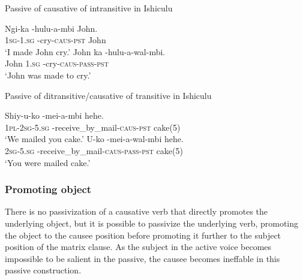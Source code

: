 \begin{exe}
\ex Passive of causative of intransitive in Ishiculu
\begin{xlist}
\ex
\gll Ngi-ka -hulu-\textbeltl a-mbi John. \\
\textsc{1sg}-\textsc{1.sg} -cry-\textsc{caus}-\textsc{pst} John \\
\trans `I made John cry.'
\ex
\gll John ka -hulu-\textbeltl a-wal\textramshorns-mbi. \\
John \textsc{1.sg} -cry-\textsc{caus}-\textsc{pass}-\textsc{pst} \\
\trans `John was made to cry.'
\end{xlist}
\ex Passive of ditransitive/causative of transitive in Ishiculu
\begin{xlist}
\ex
\gll Shiy-u-ko -me\textbeltl i-\textbeltl a-mbi hehe. \\
\textsc{1pl}-\textsc{2sg}-\textsc{5.sg} -receive\_by\_mail-\textsc{caus}-\textsc{pst} cake(5) \\
\trans `We mailed you cake.'
\ex
\gll U-ko -me\textbeltl i-\textbeltl a-wal\textramshorns-mbi hehe. \\
\textsc{2sg}-\textsc{5.sg} -receive\_by\_mail-\textsc{caus}-\textsc{pass}-\textsc{pst} cake(5) \\
\trans `You were mailed cake.'
\end{xlist}
\end{exe}

\subsubsection{Promoting object}

There is no passivization of a causative verb that directly promotes the underlying object, but it is possible to passivize the underlying verb, promoting the object to the causee position before promoting it further to the subject position of the matrix clause. As the subject in the active voice becomes impossible to be salient in the passive, the causee becomes ineffable in this passive construction.


